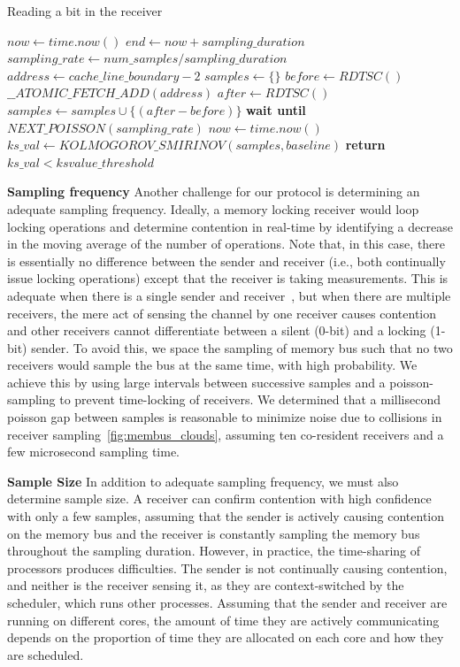 \begin{algorithm}[!t]
\caption{Reading a bit in the receiver}
\label{alg:receiver}
\begin{algorithmic}[1]
\STATE $now \leftarrow  time.now()$
\STATE $end \leftarrow now + sampling\_duration$
\STATE $sampling\_rate \leftarrow num\_samples / sampling\_duration$
\STATE $address \leftarrow cache\_line\_boundary-2$
\STATE $samples \leftarrow \{\} $
    \STATE $before \leftarrow RDTSC()$
    \STATE $\_\_ATOMIC\_FETCH\_ADD(address)$
    \STATE $after \leftarrow RDTSC()$
    \STATE $samples \leftarrow samples \cup \{(after-before)\}$
    \STATE \textbf{wait until} $NEXT\_POISSON(sampling\_rate)$
    \STATE $now \leftarrow  time.now()$
\ENDWHILE
\STATE $ks\_val \leftarrow KOLMOGOROV\_SMIRINOV(samples, baseline)$
\STATE \textbf{return} $ks\_val < ksvalue\_threshold$
\end{algorithmic}
\end{algorithm}


\textbf{Sampling frequency}
\label{sec:method:listen:freq}
Another challenge for our protocol is determining an adequate sampling
frequency. Ideally, a memory locking receiver would loop locking operations and
determine contention in real-time by identifying a decrease in the moving
average of the number of operations. Note that, in this case, there is
essentially no difference between the sender and receiver (i.e., both
continually issue locking operations) except that the receiver is taking
measurements. This is adequate when there is a single sender and
receiver~\cite{varadarajan2015}, but when there are multiple receivers, the mere
act of sensing the channel by one receiver causes contention and other receivers
cannot differentiate between a silent (0-bit) and a locking (1-bit) sender. To
avoid this, we space the sampling of memory bus such that no two receivers would
sample the bus at the same time, with high probability. We achieve this by
using large intervals between successive samples and a poisson-sampling to
prevent time-locking of receivers. We determined that a millisecond poisson gap
between samples is reasonable to minimize noise due to collisions in receiver
sampling~\ref{fig:membus_clouds}, assuming ten co-resident receivers and a few
microsecond sampling time. 

\textbf{Sample Size} 
\label{sec:method:samplingdur}
In addition to adequate sampling frequency, we must also determine sample size.  
A receiver can confirm contention with high confidence with only a
few samples, assuming that the sender is actively causing contention on the
memory bus and the receiver is constantly sampling the memory bus throughout the
sampling duration. However, in practice, the time-sharing of processors
produces difficulties. The sender is not continually causing contention, and
neither is the receiver sensing it, as they are context-switched by the
scheduler, which runs other processes. Assuming that the sender and receiver are
running on different cores, the amount of time they are actively communicating
depends on the proportion of time they are allocated on each core and how they
are scheduled. 

